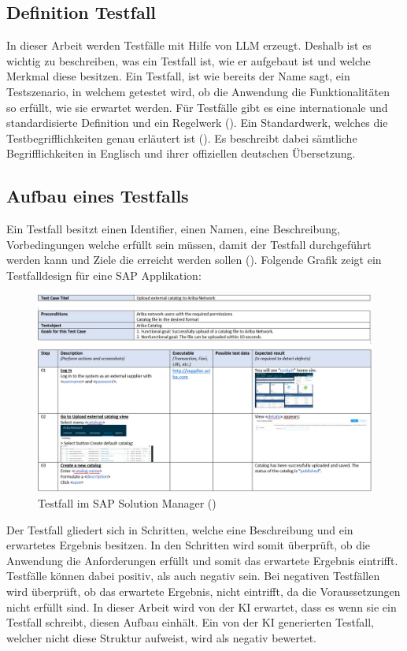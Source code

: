 \documentclass[12pt,toc=bib,toc=listof]{scrreprt}
\begin{document}
\subsection{Definition Testfall} %
\label{sec:definitionTestfall}
In dieser Arbeit werden Testfälle mit Hilfe von LLM erzeugt. Deshalb ist es wichtig zu beschreiben, was ein Testfall ist, wie er aufgebaut ist und welche Merkmal diese besitzen. Ein Testfall, ist wie bereits der Name sagt, ein Testszenario, in welchem getestet wird, ob die Anwendung die Funktionalitäten so erfüllt, wie sie erwartet werden. Für Testfälle gibt es eine internationale und standardisierte Definition und ein Regelwerk (\cite{IsoIecIeee2024}). Ein Standardwerk, welches die Testbegrifflichkeiten genau erläutert ist (\cite{Istqb2017}). Es beschreibt dabei sämtliche Begrifflichkeiten in Englisch und ihrer offiziellen deutschen Übersetzung.

\subsection{Aufbau eines Testfalls} %
\label{sec:aufbauEinesTestfalls}
Ein Testfall besitzt einen Identifier, einen Namen, eine Beschreibung, Vorbedingungen welche erfüllt sein müssen, damit der Testfall durchgeführt werden kann und Ziele die erreicht werden sollen (\cite{IsoIecIeee2024}). Folgende Grafik zeigt ein Testfalldesign für eine SAP Applikation:

\begin{figure} [H]
    \centering
    \includegraphics[width=1\linewidth]{./Bilder/Enderli_Testfall im SAP Solution Manager.jpg}
    \caption{Testfall im SAP Solution Manager (\cite{Enderli2019})}
    \label{fig:enter-label}
\end{figure}
\noindent Der Testfall gliedert sich in Schritten, welche eine Beschreibung und ein erwartetes Ergebnis besitzen. In den Schritten wird somit überprüft, ob die Anwendung die Anforderungen erfüllt und somit das erwartete Ergebnis eintrifft. Testfälle können dabei positiv, als auch negativ sein. Bei negativen Testfällen wird überprüft, ob das erwartete Ergebnis, nicht eintrifft, da die Voraussetzungen nicht erfüllt sind. In dieser Arbeit wird von der KI erwartet, dass es wenn sie ein Testfall schreibt, diesen Aufbau einhält. Ein von der KI generierten Testfall, welcher nicht diese Struktur aufweist, wird als negativ bewertet.
\end{document}
